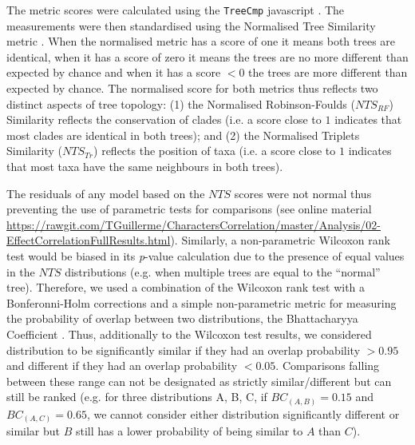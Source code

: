 \documentclass[12pt,letterpaper]{article}
\begin{document}
The metric scores were calculated using the \texttt{TreeCmp} javascript \citep{Bogdanowicz2012}.
The measurements were then standardised using the Normalised Tree Similarity metric \citep[$NTS$; i.e. centering the metrics scores using the mean metric score for 1000 pairwise comparisons between random trees with $n$ taxa;][]{Bogdanowicz2012,Guillerme2016146}.
When the normalised metric has a score of one it means both trees are identical, when it has a score of zero it means the trees are no more different than expected by chance and when it has a score $<0$ the trees are more different than expected by chance.
The normalised score for both metrics thus reflects two distinct aspects of tree topology: (1) the Normalised Robinson-Foulds ($NTS_{RF}$) Similarity reflects the conservation of clades (i.e. a score close to $1$ indicates that most clades are identical in both trees); and (2) the Normalised Triplets Similarity ($NTS_{Tr}$) reflects the position of taxa (i.e. a score close to $1$ indicates that most taxa have the same neighbours in both trees).

The residuals of any model based on the $NTS$ scores were not normal thus preventing the use of parametric tests for comparisons (see online material \url{https://rawgit.com/TGuillerme/CharactersCorrelation/master/Analysis/02-EffectCorrelationFullResults.html}). 
Similarly, a non-parametric Wilcoxon rank test \citep{hollander2013nonparametric} would be biased in its \textit{p}-value calculation due to the presence of equal values in the $NTS$ distributions (e.g. when multiple trees are equal to the ``normal'' tree).
Therefore, we used a combination of the Wilcoxon rank test with a Bonferonni-Holm corrections \citep[to ensure our significant results were robust to Type I error rate inflation;][]{holm1979simple} and a simple non-parametric metric for measuring the probability of overlap between two distributions, the Bhattacharyya Coefficient \citep[$BC$;][]{Bhattacharyya,Guillerme2016146}.
Thus, additionally to the Wilcoxon test results, we considered distribution to be significantly similar if they had an overlap probability $>0.95$ and different if they had an overlap probability $<0.05$.
Comparisons falling between these range can not be designated as strictly similar/different but can still be ranked (e.g. for three distributions A, B, C, if $BC_{(A,B)} = 0.15$ and $BC_{(A,C)} = 0.65$, we cannot consider either distribution significantly different or similar but $B$ still has a lower probability of being similar to $A$ than $C$).
\end{document}
